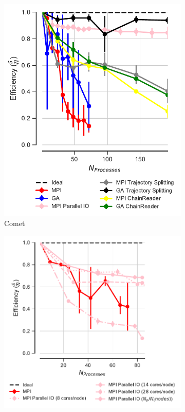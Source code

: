  \begin{figure}[ht!]
\centering
\begin{subfigure}{.3\textwidth}
  \includegraphics[width=\linewidth]{figures/Comparison_Efficiency_all_Comet.pdf}
  \caption{Comet}
  \label{fig:comparison_efficiency}
\end{subfigure}
\hfill
\begin{subfigure}{.35\textwidth}
  \includegraphics[width=\linewidth]{figures/Comparison_Efficiency_all_Bridges.pdf}

\end{subfigure}
\end{figure}
